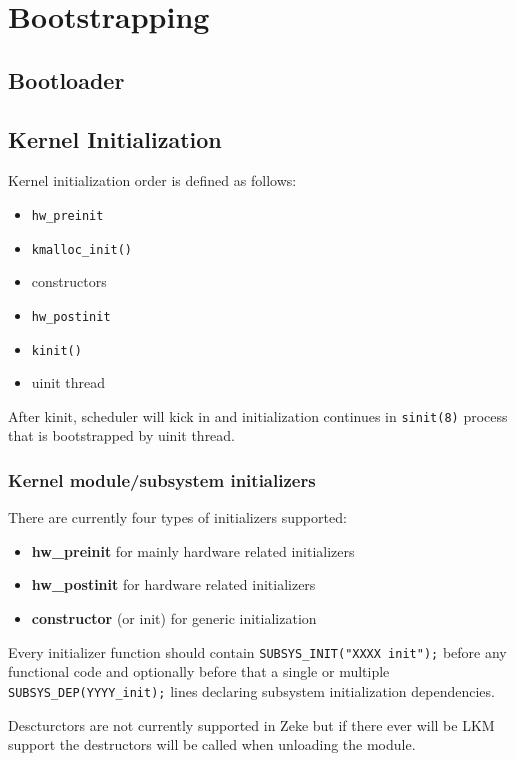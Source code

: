 \part{Bootstrapping}
\chapter{Bootloader}
\chapter{Kernel Initialization}

Kernel initialization order is defined as follows:
\begin{itemize}
    \item \verb+hw_preinit+
    \item \verb+kmalloc_init()+
    \item constructors
    \item \verb+hw_postinit+
    \item \verb+kinit()+
    \item uinit thread
\end{itemize}

After kinit, scheduler will kick in and initialization continues in
\verb+sinit(8)+ process that is bootstrapped by uinit thread.

\section{Kernel module/subsystem initializers}

There are currently four types of initializers supported:

\begin{itemize}
    \item \textbf{hw\_preinit} for mainly hardware related initializers
    \item \textbf{hw\_postinit} for hardware related initializers
    \item \textbf{constructor} (or init) for generic initialization
\end{itemize}

Every initializer function should contain \verb+SUBSYS_INIT("XXXX init");+
before any functional code and optionally before that a single or multiple
\verb+SUBSYS_DEP(YYYY_init);+ lines declaring subsystem initialization
dependencies.

Descturctors are not currently supported in Zeke but if there ever will be LKM
support the destructors will be called when unloading the module.

